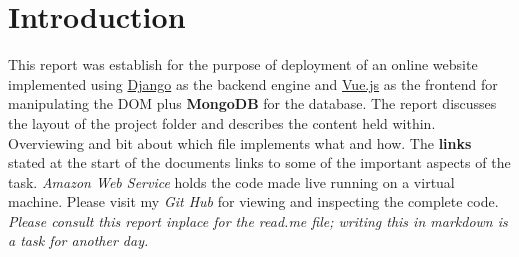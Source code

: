 \documentclass[11pt]{article}
\begin{document}
\section{Introduction}
This report was establish for the purpose of deployment of an online website implemented using \href{https://www.djangoproject.com/}{Django} as the backend engine and \href{https://vuejs.org/}{Vue.js} as the frontend for manipulating the DOM plus \textbf{MongoDB} for the database.
The report discusses the layout of the project folder and describes the content held within.
Overviewing and bit about which file implements what and how.
The \textbf{links} stated at the start of the documents links to some of the important aspects of the task.
\textit{Amazon Web Service} holds the code made live running on a virtual machine.
Please visit my \textit{Git Hub} for viewing and inspecting the complete code.
\textit{Please consult this report inplace for the read.me file; writing this in markdown is a task for another day.}
\end{document}
